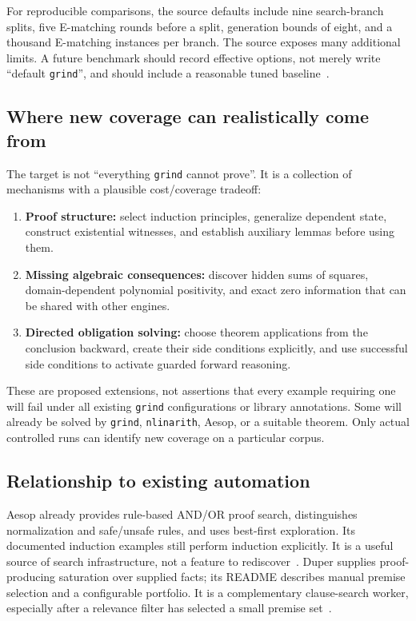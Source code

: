 \documentclass[11pt,a4paper]{article}
\theoremstyle{definition}
\newcommand{\grind}{\texttt{grind}}
\newcommand{\code}[1]{\texttt{#1}}
\begin{document}
For reproducible comparisons, the source defaults include nine search-branch splits, five E-matching rounds before a split, generation bounds of eight, and a thousand E-matching instances per branch. The source exposes many additional limits. A future benchmark should record effective options, not merely write ``default \grind{}'', and should include a reasonable tuned baseline~\cite{grindconfig}.

\subsection{Where new coverage can realistically come from}

The target is not ``everything \grind{} cannot prove''. It is a collection of mechanisms with a plausible cost/coverage tradeoff:

\begin{enumerate}
\item \textbf{Proof structure:} select induction principles, generalize dependent state, construct existential witnesses, and establish auxiliary lemmas before using them.
\item \textbf{Missing algebraic consequences:} discover hidden sums of squares, domain-dependent polynomial positivity, and exact zero information that can be shared with other engines.
\item \textbf{Directed obligation solving:} choose theorem applications from the conclusion backward, create their side conditions explicitly, and use successful side conditions to activate guarded forward reasoning.
\end{enumerate}

These are proposed extensions, not assertions that every example requiring one will fail under all existing \grind{} configurations or library annotations. Some will already be solved by \grind{}, \code{nlinarith}, Aesop, or a suitable theorem. Only actual controlled runs can identify new coverage on a particular corpus.

\subsection{Relationship to existing automation}

Aesop already provides rule-based AND/OR proof search, distinguishes normalization and safe/unsafe rules, and uses best-first exploration. Its documented induction examples still perform induction explicitly. It is a useful source of search infrastructure, not a feature to rediscover~\cite{aesop}. Duper supplies proof-producing saturation over supplied facts; its README describes manual premise selection and a configurable portfolio. It is a complementary clause-search worker, especially after a relevance filter has selected a small premise set~\cite{duper}.
\end{document}
